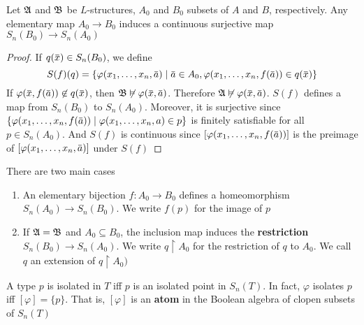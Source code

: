 \documentclass[11pt]{article}
\begin{document}
\begin{lemma}[]
\label{lemma4.2.5}
Let \(\mathfrak{A}\) and \(\mathfrak{B}\) be \(L\)-structures, \(A_0\) and \(B_0\) subsets of
\(A\) and \(B\), respectively. Any elementary map \(A_0\to B_0\) induces a
continuous surjective map \(S_n(B_0)\to S_n(A_0)\)
\end{lemma}

\begin{proof}
If \(q(\bbar{x})\in S_n(B_0)\), we define
\begin{equation*}
S(f)(q)=\{\varphi(x_1,\dots,x_n,\bbar{a})\mid\bbar{a}\in A_0,\varphi(x_1,\dots,x_n,f(\bbar{a}))\in q(\bbar{x})\}
\end{equation*}
If \(\varphi(\bbar{x},f(\bbar{a}))\not\in q(\bbar{x})\), then
\(\fB\not\vDash\varphi(\bbar{x},\bbar{a})\). Therefore \(\fA\not\vDash\varphi(\bbar{x},\bbar{a})\).
\(S(f)\) defines a map from \(S_n(B_0)\) to \(S_n(A_0)\). Moreover, it is surjective since
\(\{\varphi(x_1,\dots,x_n,f(\bbar{a}))\mid\varphi(x_1,\dots,x_n,a)\in p\}\) is finitely satisfiable for all \(p\in S_n(A_0)\).
And \(S(f)\) is continuous since \([\varphi(x_1,\dots,x_n,f(\bbar{a}))]\) is the preimage of
\([\varphi(x_1,\dots,x_n,\bbar{a})]\) under \(S(f)\)
\end{proof}

There are two main cases
\begin{enumerate}
\item An elementary bijection \(f:A_0\to B_0\) defines a homeomorphism
\(S_n(A_0)\to S_n(B_0)\). We write \(f(p)\) for the image of \(p\)
\item If \(\mathfrak{A}=\mathfrak{B}\) and \(A_0\subseteq B_0\), the inclusion map induces the
\textbf{restriction} \(S_n(B_0)\to S_n(A_0)\). We write \(q\restriction A_0\) for
the restriction of \(q\) to \(A_0\). We call \(q\) an extension of
\(q\restriction A_0)\)
\end{enumerate}



\begin{lemma}[]
\label{lemma4.2.6}
  A type \(p\) is isolated in \(T\) iff \(p\) is an isolated point in
  \(S_n(T)\). In fact, \(\varphi\) isolates \(p\) iff \([\varphi]=\{p\}\). That is, \([\varphi]\)
  is an \textbf{atom} in the Boolean algebra of clopen subsets of \(S_n(T)\)
\end{lemma}
\end{document}
